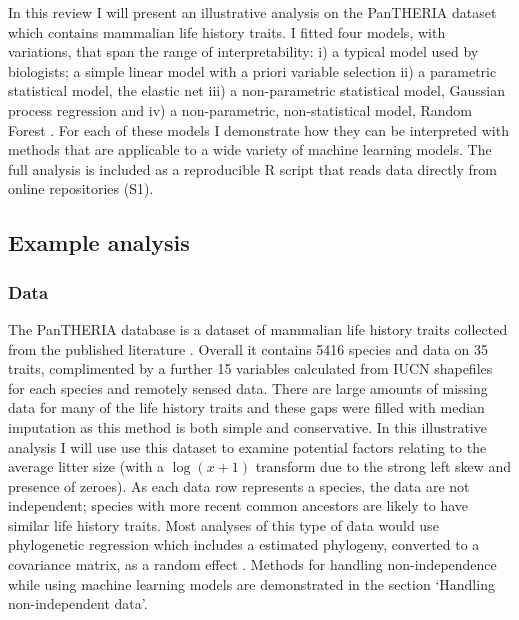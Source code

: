 \documentclass[10pt,]{article}
\begin{document}
In this review I will present an illustrative analysis on the PanTHERIA dataset \citep{jones2009pantheria} which contains mammalian life history traits. I fitted four models, with variations, that span the range of interpretability: i) a typical model used by biologists; a simple linear model with a priori variable selection ii) a parametric statistical model, the elastic net \citep{elasticnet} iii) a non-parametric statistical model, Gaussian process regression \citep{rasmussen2004gaussian} and iv) a non-parametric, non-statistical model, Random Forest \citep{breiman2001random}. For each of these models I demonstrate how they can be interpreted with methods that are applicable to a wide variety of machine learning models. The full analysis is included as a reproducible R \citep{R} script that reads data directly from online repositories (S1).

\subsection{Example analysis}\label{example-analysis}

\subsubsection{Data}\label{data}

The PanTHERIA database is a dataset of mammalian life history traits collected from the published literature \citep{jones2009pantheria}. Overall it contains 5416 species and data on 35 traits, complimented by a further 15 variables calculated from IUCN shapefiles for each species and remotely sensed data. There are large amounts of missing data for many of the life history traits and these gaps were filled with median imputation as this method is both simple and conservative. In this illustrative analysis I will use use this dataset to examine potential factors relating to the average litter size (with a \(\log(x+1)\) transform due to the strong left skew and presence of zeroes). As each data row represents a species, the data are not independent; species with more recent common ancestors are likely to have similar life history traits. Most analyses of this type of data \citep[\citet{others}]{gay2014parasite} would use phylogenetic regression which includes a estimated phylogeny, converted to a covariance matrix, as a random effect \citep{magnusson2017glmmtmb, caper}. Methods for handling non-independence while using machine learning models are demonstrated in the section `Handling non-independent data'.
\end{document}
